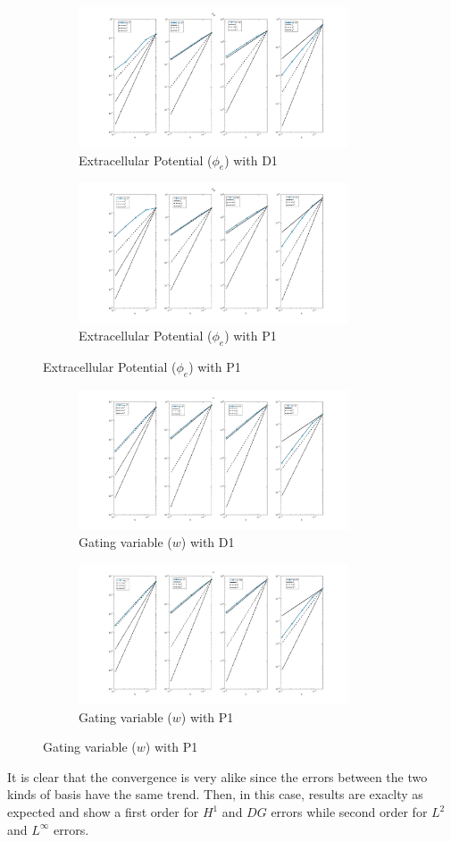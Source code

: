 \documentclass[a4paper,11pt]{article}
\begin{document}
\begin{figure}[h]
\begin{subfigure}{0.5\textwidth}
\includegraphics[width = 8cm]{./D1_Phie_1.jpg}
\caption*{Extracellular Potential ($\phi_e$) with D1}
\label{Phie_D1}
\end{subfigure}
\begin{subfigure}{0.5\textwidth}
\includegraphics[width =8cm]{./P1_Phie_1.jpg}
\caption*{Extracellular Potential ($\phi_e$) with P1}
\label{Phie_P1}
\end{subfigure}
\end{figure}
\begin{figure}[h]
\begin{subfigure}{0.5\textwidth}
\includegraphics[width = 8cm]{./D1_w_1.jpg}
\caption*{Gating variable ($w$) with D1}
\label{w_D1}
\end{subfigure}
\begin{subfigure}{0.5\textwidth}
\includegraphics[width =8cm]{./P1_w_1.jpg}
\caption*{Gating variable ($w$) with P1}
\label{w_P1}
\end{subfigure}
\end{figure}
\newpage
\noindent It is clear that the convergence is very alike since the errors between the two kinds of basis have the same trend. Then, in this case, results are exaclty as expected and show a first order for $H^1$ and $DG$ errors while second order for $L^2$ and $L^\infty$ errors.
\end{document}
